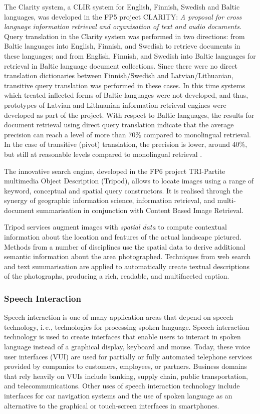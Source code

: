 \begin{multicols}{2}
The Clarity system, a CLIR system for English, Finnish, Swedish and Baltic languages, was developed in the FP5 project CLARITY: \textit{A proposal for cross language information retrieval and organisation of text and audio documents.} Query translation in the Clarity system was performed in two directions: from Baltic languages into English, Finnish, and Swedish to retrieve documents in these languages; and from English, Finnish, and Swedish into Baltic languages for retrieval in Baltic language document collections.
Since there were no direct translation dictionaries between Finnish/Swedish and Latvian/Lithuanian, transitive query translation was performed in these cases.
In this time systems which treated inflected forms of Baltic languages were not developed, and thus, prototypes of Latvian and Lithuanian information retrieval engines were developed as part of the project.
With respect to Baltic languages, the results for document retrieval using direct query translation indicate that the average precision can reach a level of more than 70\% compared to monolingual retrieval.
In the case of transitive (pivot) translation, the precision is lower, around 40\%, but still at reasonable levels compared to monolingual retrieval \cite{meta18}.

The innovative search engine, developed in the FP6 project TRI-Partite multimedia Object Description (Tripod), allows to locate images using a range of keyword, conceptual and spatial query constructors.
It is realised through the synergy of geographic information science, information retrieval, and multi-document summarisation in conjunction with Content Based Image Retrieval.

Tripod services augment images with \textit{spatial data }to compute contextual information about the location and features of the actual landscape pictured.
Methods from a number of disciplines use the spatial data to derive additional semantic information about the area photographed.
Techniques from web search and text summarisation are applied to automatically create textual descriptions of the photographs, producing a rich, readable, and multifaceted caption.

\subsubsection{Speech Interaction}

Speech interaction is one of many application areas that depend on speech technology, i.\,e., technologies for processing spoken language.  Speech interaction technology is used to create interfaces that enable users to interact in spoken language instead of a graphical display, keyboard and mouse.  Today, these voice user interfaces (VUI) are used for partially or fully automated telephone services provided by companies to customers, employees, or partners.  Business domains that rely heavily on VUIs include banking, supply chain, public transportation, and telecommunications.  Other uses of speech interaction technology include interfaces for car navigation systems and the use of spoken language as an alternative to the graphical or touch-screen interfaces in smartphones.


\end{multicols}
